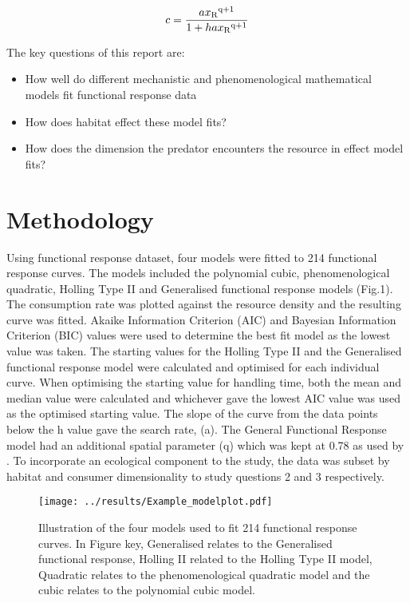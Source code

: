 \documentclass[11pt]{article}
\begin{document}
$$c=\frac{ax\textsubscript{R}\textsuperscript{q+1}}{1 + hax\textsubscript{R}\textsuperscript{q+1}}$$

The key questions of this report are:
	\begin{itemize}
	\item How well do different mechanistic and phenomenological mathematical models fit functional response data
	\item How does habitat effect these model fits? 
	\item How does the dimension the predator encounters the resource in effect model fits? 
	\end{itemize}
\newpage

	\section*{Methodology}
\noindent

Using \cite{Pawar2012} functional response dataset, four models were fitted to 214 functional response curves. The models included the polynomial cubic, phenomenological quadratic, Holling Type II and Generalised functional response models (Fig.1). The consumption rate was plotted against the resource density and the resulting curve was fitted. Akaike Information Criterion (AIC) and Bayesian Information Criterion (BIC) values were used to determine the best fit model as the lowest value was taken.
The starting values for the Holling Type II and the Generalised functional response model were calculated and optimised for each individual curve. When optimising the starting value for handling time, both the mean and median value were calculated and whichever gave the lowest AIC value was used as the optimised starting value. The slope of the curve from the data points below the h value gave the search rate, (a). The General Functional Response model had an additional spatial parameter (q) which was kept at 0.78 as used by \cite{Pawar2012}. To incorporate an ecological component to the study, the data was subset by habitat and consumer dimensionality to study questions 2 and 3 respectively. \newline

\begin{figure}[h!]
	\centering 
	\texttt{[image: ../results/Example\_modelplot.pdf]}
	\caption{Illustration of the four models used to fit 214 functional response curves. In Figure key, Generalised relates to the Generalised functional response, Holling II related to the Holling Type II model, Quadratic relates to the phenomenological quadratic model and the cubic relates to the polynomial cubic model.}
	\label{Four models plotted}
\end{figure}
\end{document}
